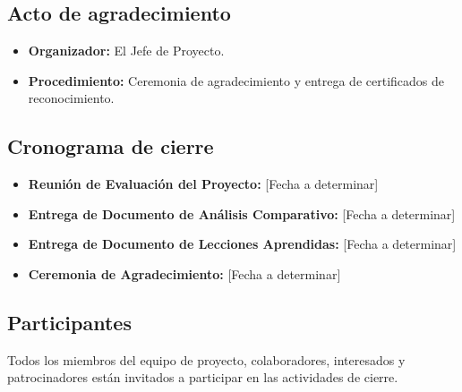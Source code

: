 \subsection{Acto de agradecimiento}
\begin{itemize}
	\item \textbf{Organizador:} El Jefe de Proyecto.
	\item \textbf{Procedimiento:} Ceremonia de agradecimiento y entrega de certificados de reconocimiento.
\end{itemize}

\subsection{Cronograma de cierre}
\begin{itemize}
	\item \textbf{Reunión de Evaluación del Proyecto:} [Fecha a determinar]
	\item \textbf{Entrega de Documento de Análisis Comparativo:} [Fecha a determinar]
	\item \textbf{Entrega de Documento de Lecciones Aprendidas:} [Fecha a determinar]
	\item \textbf{Ceremonia de Agradecimiento:} [Fecha a determinar]
\end{itemize}

\subsection*{Participantes}
Todos los miembros del equipo de proyecto, colaboradores, interesados y patrocinadores están invitados a participar en las actividades de cierre.
